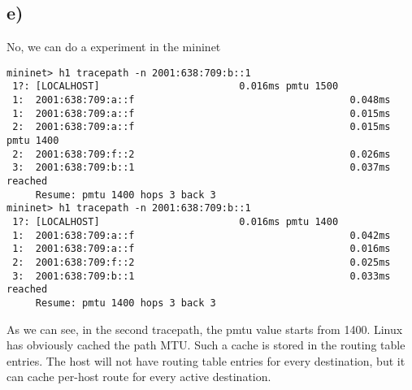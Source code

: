 \documentclass{article}
\begin{document}
\subsection*{e)}
No, we can do a experiment in the mininet
\begin{verbatim}
mininet> h1 tracepath -n 2001:638:709:b::1
 1?: [LOCALHOST]                        0.016ms pmtu 1500
 1:  2001:638:709:a::f                                     0.048ms
 1:  2001:638:709:a::f                                     0.015ms
 2:  2001:638:709:a::f                                     0.015ms pmtu 1400
 2:  2001:638:709:f::2                                     0.026ms
 3:  2001:638:709:b::1                                     0.037ms reached
     Resume: pmtu 1400 hops 3 back 3
mininet> h1 tracepath -n 2001:638:709:b::1
 1?: [LOCALHOST]                        0.016ms pmtu 1400
 1:  2001:638:709:a::f                                     0.042ms
 1:  2001:638:709:a::f                                     0.016ms
 2:  2001:638:709:f::2                                     0.025ms
 3:  2001:638:709:b::1                                     0.033ms reached
     Resume: pmtu 1400 hops 3 back 3
\end{verbatim}
As we can see, in the second tracepath, the pmtu value starts from 1400. Linux
has obviously cached the path MTU. Such a cache is stored in the routing table
entries. The host will not have routing table entries for every destination, but
it can cache per-host route for every active destination\cite{RFC1191}.


 

\end{document}
